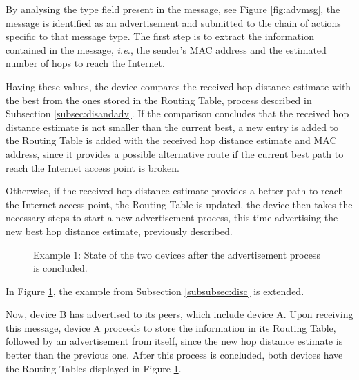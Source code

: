 By analysing the type field present in the message, see Figure \ref{fig:advmsg}, the message is identified as an advertisement and submitted to the chain of actions specific to that message type. The first step is to extract the information contained in the message, \textit{i.e.}, the sender's \gls{MAC} address and the estimated number of hops to reach the Internet.

Having these values, the device compares the received hop distance estimate with the best from the ones stored in the Routing Table, process described in Subsection \ref{subsec:disandadv}. If the comparison concludes that the received hop distance estimate is not smaller than the current best, a new entry is added to the Routing Table is added with the received hop distance estimate and \gls{MAC} address, since it provides a possible alternative route if the current best path to reach the Internet access point is broken.

Otherwise, if the received hop distance estimate provides a better path to reach the Internet access point, the Routing Table is updated, the device then takes the necessary steps to start a new advertisement process, this time advertising the new best hop distance estimate, previously described. 

\begin{figure}[ht]
   \noindent{}
	\caption{\label{fig:adveg2} Example 1: State of the two devices after the advertisement process is concluded.} 
\end{figure}

In Figure \ref{fig:adveg2}, the example from Subsection \ref{subsubsec:disc} is extended.

Now, device B has advertised to its peers, which include device A. Upon receiving this message, device A proceeds to store the information in its Routing Table, followed by an advertisement from itself, since the new hop distance estimate is better than the previous one. After this process is concluded, both devices have the Routing Tables displayed in Figure \ref{fig:adveg2}.

